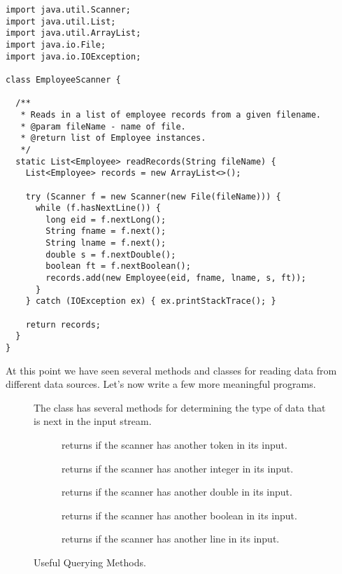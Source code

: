 \begin{lstlisting}[language=MyJava]
import java.util.Scanner;
import java.util.List;
import java.util.ArrayList;
import java.io.File;
import java.io.IOException;

class EmployeeScanner {

  /**
   * Reads in a list of employee records from a given filename.
   * @param fileName - name of file.
   * @return list of Employee instances.
   */
  static List<Employee> readRecords(String fileName) {
    List<Employee> records = new ArrayList<>();

    try (Scanner f = new Scanner(new File(fileName))) {
      while (f.hasNextLine()) {
        long eid = f.nextLong();
        String fname = f.next();
        String lname = f.next();
        double s = f.nextDouble();
        boolean ft = f.nextBoolean();
        records.add(new Employee(eid, fname, lname, s, ft));
      }
    } catch (IOException ex) { ex.printStackTrace(); }

    return records;
  }
}
\end{lstlisting}

At this point we have seen several methods and classes for reading data from different data sources. Let's now write a few more meaningful programs.

\begin{figure}[tp]
  \small
  \begin{tcolorbox}[title=Scanner Querying Methods]
    The  class has several methods for determining the type of data that is next in the input stream.
    \vspace{2ex}
  \begin{description}
    \item [] returns  if the scanner has another token in its input.
    \item [] returns  if the scanner has another integer in its input.
    \item [] returns  if the scanner has another double in its input.
    \item [] returns  if the scanner has another boolean in its input.
    \item [] returns  if the scanner has another line in its input.
  \end{description}
\end{tcolorbox}
\caption{Useful  Querying Methods.}
\label{fig:scq}
\end{figure}

